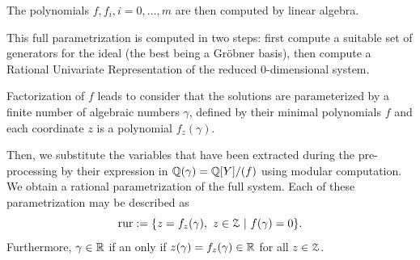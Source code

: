 The polynomials $f, f_i, i = 0, \ldots, m$ are then computed by linear algebra.


This full parametrization is computed in two steps:
first compute a suitable set of generators for the ideal (the best being a Gröbner basis),
then compute a Rational Univariate Representation of the reduced
0-dimensional system.

Factorization of $f$ leads to consider that the solutions are parameterized by a finite number of algebraic numbers
$\gamma$, defined by their minimal polynomials $f$ and each coordinate $z$ is a polynomial $f_z (\gamma)$.

Then, we substitute the variables that have been extracted during the
pre-processing by their expression in $\mathbb{Q}(\gamma) = \mathbb{Q}[Y]/(f)$ using modular computation.
We obtain a rational  parametrization of the full system.
Each of these parametrization may be described as
$$\mathrm{rur}:=\{z=f_{z}(\gamma),\ z \in \cZ \ |\  f(\gamma)=0\}.$$
Furthermore, $\gamma \in \mathbb{R}$ if an only if $z(\gamma) = f_z(\gamma) \in \mathbb{R}$ for all $z \in {\mathcal Z}$.


